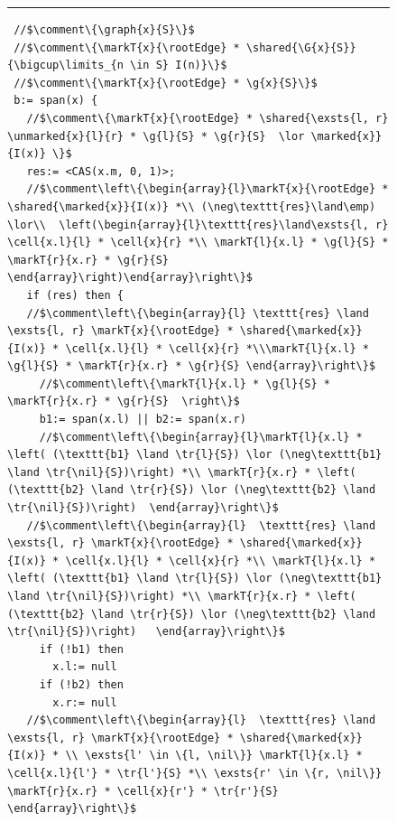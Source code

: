 %
%
\begin{figure}
\hrule
\begin{lstlisting}
 //$\comment\{\graph{x}{S}\}$
 //$\comment\{\markT{x}{\rootEdge} * \shared{\G{x}{S}}{\bigcup\limits_{n \in S} I(n)}\}$
 //$\comment\{\markT{x}{\rootEdge} * \g{x}{S}\}$
 b:= span(x) {
   //$\comment\{\markT{x}{\rootEdge} * \shared{\exsts{l, r} \unmarked{x}{l}{r} * \g{l}{S} * \g{r}{S}  \lor \marked{x}}{I(x)} \}$
   res:= <CAS(x.m, 0, 1)>;
   //$\comment\left\{\begin{array}{l}\markT{x}{\rootEdge} * \shared{\marked{x}}{I(x)} *\\ (\neg\texttt{res}\land\emp) \lor\\  \left(\begin{array}{l}\texttt{res}\land\exsts{l, r} \cell{x.l}{l} * \cell{x}{r} *\\ \markT{l}{x.l} * \g{l}{S} * \markT{r}{x.r} * \g{r}{S} \end{array}\right)\end{array}\right\}$
   if (res) then { 
   //$\comment\left\{\begin{array}{l} \texttt{res} \land \exsts{l, r} \markT{x}{\rootEdge} * \shared{\marked{x}}{I(x)} * \cell{x.l}{l} * \cell{x}{r} *\\\markT{l}{x.l} * \g{l}{S} * \markT{r}{x.r} * \g{r}{S} \end{array}\right\}$
     //$\comment\left\{\markT{l}{x.l} * \g{l}{S} * \markT{r}{x.r} * \g{r}{S}  \right\}$   
     b1:= span(x.l) || b2:= span(x.r)
     //$\comment\left\{\begin{array}{l}\markT{l}{x.l} * \left( (\texttt{b1} \land \tr{l}{S}) \lor (\neg\texttt{b1} \land \tr{\nil}{S})\right) *\\ \markT{r}{x.r} * \left( (\texttt{b2} \land \tr{r}{S}) \lor (\neg\texttt{b2} \land \tr{\nil}{S})\right)  \end{array}\right\}$   
   //$\comment\left\{\begin{array}{l}  \texttt{res} \land \exsts{l, r} \markT{x}{\rootEdge} * \shared{\marked{x}}{I(x)} * \cell{x.l}{l} * \cell{x}{r} *\\ \markT{l}{x.l} * \left( (\texttt{b1} \land \tr{l}{S}) \lor (\neg\texttt{b1} \land \tr{\nil}{S})\right) *\\ \markT{r}{x.r} * \left( (\texttt{b2} \land \tr{r}{S}) \lor (\neg\texttt{b2} \land \tr{\nil}{S})\right)   \end{array}\right\}$  
     if (!b1) then 
       x.l:= null
     if (!b2) then 
       x.r:= null
   //$\comment\left\{\begin{array}{l}  \texttt{res} \land \exsts{l, r} \markT{x}{\rootEdge} * \shared{\marked{x}}{I(x)} * \\ \exsts{l' \in \{l, \nil\}} \markT{l}{x.l} * \cell{x.l}{l'} * \tr{l'}{S} *\\ \exsts{r' \in \{r, \nil\}} \markT{r}{x.r} * \cell{x}{r'} * \tr{r'}{S} \end{array}\right\}$      

\end{lstlisting}
\end{figure}
